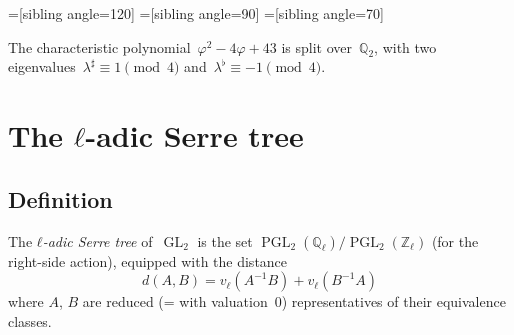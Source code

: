 \documentclass{article}%
\DeclareMathOperator{\PGL}{PGL}
\DeclareMathOperator{\GL}{GL}
\begin{document}
=[sibling angle=120]
=[sibling angle=90]
=[sibling angle=70]


The characteristic polynomial~$φ^2-4φ+43$ is split over~$ℚ_2$, with two
eigenvalues~$λ^{♯} ≡ 1 \pmod{4}$ and~$λ^{♭} ≡ -1 \pmod{4}$.
\section{The $ℓ$-adic Serre tree}%
\subsection{Definition}%
\begin{df}
The \emph{$ℓ$-adic Serre tree} of~$\GL_2$ is the set
$\PGL_2(ℚ_{ℓ})/\PGL_2(ℤ_{ℓ})$ (for the right-side action), equipped with
the distance
\begin{equation}
d(A, B) = v_{ℓ}(A^{-1} B) + v_{ℓ} (B^{-1} A)
\end{equation}
where $A$, $B$ are reduced (= with valuation~$0$) representatives of
their equivalence classes.
\end{df}
\end{document}
